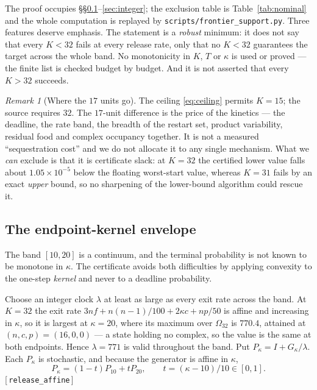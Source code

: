 \documentclass[11pt]{article}
\theoremstyle{plain}
\theoremstyle{definition}
\theoremstyle{remark}
\newtheorem{remark}[theorem]{Remark}
\newcommand{\leanref}[1]{{\normalfont\sffamily\footnotesize[\,#1\,]}}
\begin{document}
The proof occupies \S\S\ref{sec:envelope}--\ref{sec:integer}; the exclusion
table is Table~\ref{tab:nominal} and the whole computation is replayed by
\texttt{scripts/frontier\_support.py}. Three features deserve emphasis. The
statement is a \emph{robust} minimum: it does not say that every $K<32$ fails
at every release rate, only that no $K<32$ guarantees the target across the
whole band. No monotonicity in $K$, $T$ or $\kappa$ is used or proved --- the
finite list is checked budget by budget. And it is not asserted that every
$K>32$ succeeds.

\begin{remark}[Where the $17$ units go]
The ceiling \eqref{eq:ceiling} permits $K=15$; the source requires $32$. The
$17$-unit difference is the price of the kinetics --- the deadline, the rate
band, the breadth of the restart set, product variability, residual food and
complex occupancy together. It is not a measured ``sequestration cost'' and we
do not allocate it to any single mechanism. What we \emph{can} exclude is that
it is certificate slack: at $K=32$ the certified lower value falls about
$1.05\times10^{-5}$ below the floating worst-start value, whereas $K=31$ fails
by an exact \emph{upper} bound, so no sharpening of the lower-bound algorithm
could rescue it.
\end{remark}

\subsection{The endpoint-kernel envelope}\label{sec:envelope}

The band $[10,20]$ is a continuum, and the terminal probability is not known
to be monotone in $\kappa$. The certificate avoids both difficulties by
applying convexity to the one-step \emph{kernel} and never to a deadline
probability.

Choose an integer clock $\lambda$ at least as large as every exit rate across
the band. At $K=32$ the exit rate
$3nf+n(n-1)/100+2\kappa c+np/50$ is affine and increasing in $\kappa$, so it is
largest at $\kappa=20$, where its maximum over $\Omega_{32}$ is $770.4$,
attained at $(n,c,p)=(16,0,0)$ --- a state holding no complex, so the value is
the same at both endpoints. Hence $\lambda=771$ is valid throughout the band. Put $P_\kappa=I+G_\kappa/\lambda$. Each $P_\kappa$
is stochastic, and because the generator is affine in $\kappa$,
\begin{equation}\label{eq:affine}
P_\kappa=(1-t)P_{10}+tP_{20},\qquad t=(\kappa-10)/10\in[0,1].
\end{equation}
\leanref{\texttt{release\_affine}}
\end{document}
